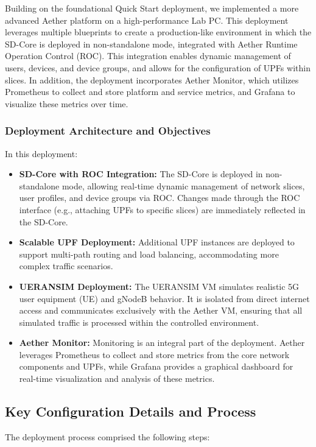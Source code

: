 Building on the foundational Quick Start deployment, we implemented a more advanced Aether platform on a high-performance Lab PC. This deployment leverages multiple blueprints to create a production-like environment in which the SD-Core is deployed in non-standalone mode, integrated with Aether Runtime Operation Control (ROC). This integration enables dynamic management of users, devices, and device groups, and allows for the configuration of UPFs within slices. In addition, the deployment incorporates Aether Monitor, which utilizes Prometheus to collect and store platform and service metrics, and Grafana to visualize these metrics over time.

\subsubsection*{Deployment Architecture and Objectives}
In this deployment:
\begin{itemize}
    \item \textbf{SD-Core with ROC Integration:}  
    The SD-Core is deployed in non-standalone mode, allowing real-time dynamic management of network slices, user profiles, and device groups via ROC. Changes made through the ROC interface (e.g., attaching UPFs to specific slices) are immediately reflected in the SD-Core.
    \item \textbf{Scalable UPF Deployment:}  
    Additional UPF instances are deployed to support multi-path routing and load balancing, accommodating more complex traffic scenarios.
    \item \textbf{UERANSIM Deployment:}  
    The UERANSIM VM simulates realistic 5G user equipment (UE) and gNodeB behavior. It is isolated from direct internet access and communicates exclusively with the Aether VM, ensuring that all simulated traffic is processed within the controlled environment.
    \item \textbf{Aether Monitor:}  
    Monitoring is an integral part of the deployment. Aether leverages Prometheus to collect and store metrics from the core network components and UPFs, while Grafana provides a graphical dashboard for real-time visualization and analysis of these metrics.
\end{itemize}

\subsection*{Key Configuration Details and Process}
The deployment process comprised the following steps:

